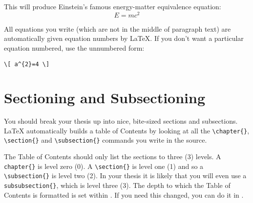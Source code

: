 This will produce Einstein's famous energy-matter equivalence equation:
\begin{equation}
E = mc^{2}
\label{eqn:Einstein}
\end{equation}

All equations you write (which are not in the middle of paragraph text) are automatically given equation numbers by \LaTeX{}. If you don't want a particular equation numbered, use the unnumbered form:
\begin{verbatim}
\[ a^{2}=4 \]
\end{verbatim}


\section{Sectioning and Subsectioning}

You should break your thesis up into nice, bite-sized sections and subsections. \LaTeX{} automatically builds a table of Contents by looking at all the \verb|\chapter{}|, \verb|\section{}|  and \verb|\subsection{}| commands you write in the source.

The Table of Contents should only list the sections to three (3) levels. A \verb|chapter{}| is level zero (0). A \verb|\section{}| is level one (1) and so a \verb|\subsection{}| is level two (2). In your thesis it is likely that you will even use a \verb|subsubsection{}|, which is level three (3). The depth to which the Table of Contents is formatted is set within . If you need this changed, you can do it in .



